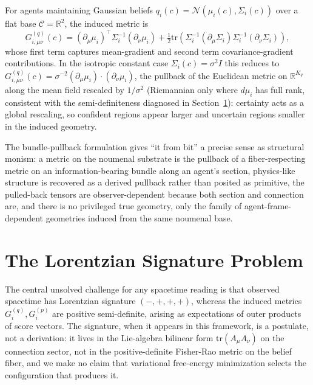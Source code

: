 \documentclass[11pt]{article}
\begin{document}
For agents maintaining Gaussian beliefs $q_i(c) = \mathcal{N}(\mu_i(c), \Sigma_i(c))$ over a flat base $\mathcal{C} = \mathbb{R}^2$, the induced metric is
\begin{equation}
G^{(q)}_{i,\mu\nu}(c) = (\partial_\mu \mu_i)^\top \Sigma_i^{-1} (\partial_\nu \mu_i) + \tfrac{1}{2}\mathrm{tr}\left(\Sigma_i^{-1}(\partial_\mu \Sigma_i)\Sigma_i^{-1}(\partial_\nu \Sigma_i)\right),
\end{equation}
whose first term captures mean-gradient and second term covariance-gradient contributions. In the isotropic constant case $\Sigma_i(c) = \sigma^2 I$ this reduces to $G^{(q)}_{i,\mu\nu}(c) = \sigma^{-2}(\partial_\mu\mu_i)\cdot(\partial_\nu\mu_i)$, the pullback of the Euclidean metric on $\mathbb{R}^{K_q}$ along the mean field rescaled by $1/\sigma^2$ (Riemannian only where $d\mu_i$ has full rank, consistent with the semi-definiteness diagnosed in Section~\ref{sec:signature_resolution}): certainty acts as a global rescaling, so confident regions appear larger and uncertain regions smaller in the induced geometry.

The bundle-pullback formulation gives ``it from bit'' a precise sense as structural monism: a metric on the noumenal substrate is the pullback of a fiber-respecting metric on an information-bearing bundle along an agent's section, physics-like structure is recovered as a derived pullback rather than posited as primitive, the pulled-back tensors are observer-dependent because both section and connection are, and there is no privileged true geometry, only the family of agent-frame-dependent geometries induced from the same noumenal base.

\section{The Lorentzian Signature Problem}\label{sec:signature_resolution}

The central unsolved challenge for any spacetime reading is that observed spacetime has Lorentzian signature $(-,+,+,+)$, whereas the induced metrics $G_i^{(q)}, G_i^{(p)}$ are positive semi-definite, arising as expectations of outer products of score vectors. The signature, when it appears in this framework, is a postulate, not a derivation: it lives in the Lie-algebra bilinear form $\mathrm{tr}(A_\mu A_\nu)$ on the connection sector, not in the positive-definite Fisher-Rao metric on the belief fiber, and we make no claim that variational free-energy minimization selects the configuration that produces it.
\end{document}

